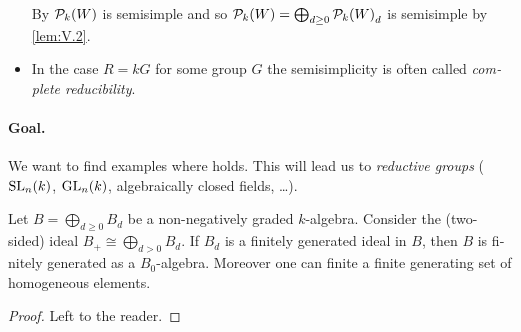 \documentclass[12pt,a4paper]{scrartcl}
\theoremstyle{cplain}
\theoremstyle{cplain}
\theoremstyle{cplain}
\theoremstyle{definition}
\begin{document}
\begin{otherlanguage}{english}
\begin{itemize}
  By  $\mathcal{P}_k(W)$ is semisimple and so $\mathcal{P}_k(W) = \bigoplus_{d\ge0}{\mathcal{P}_k(W)}_d$ is semisimple by \cref{lem:V.2}.
  \item In the case $R=kG$ for some group $G$ the semisimplicity is often called \emph{complete reducibility}.
\end{itemize}

\paragraph{Goal.} We want to find examples where  holds. This will lead us to \emph{reductive groups} ($\operatorname{SL}_n(k)$, $\operatorname{GL}_n(k)$, algebraically closed fields, \ldots).

\begin{lem} \label{lem:V.7} %
  Let $B=\bigoplus_{d\ge0}B_d$ be a non-negatively graded $k$-algebra. Consider the (two-sided) ideal $B_+ \cong \bigoplus_{d>0}B_d$. If $B_d$ is a finitely generated ideal in $B$, then $B$ is finitely generated as a $B_0$-algebra. Moreover one can finite a finite generating set of homogeneous elements.
\end{lem}
\begin{proof}
  Left to the reader.
\end{proof}


\end{otherlanguage}
\end{document}
